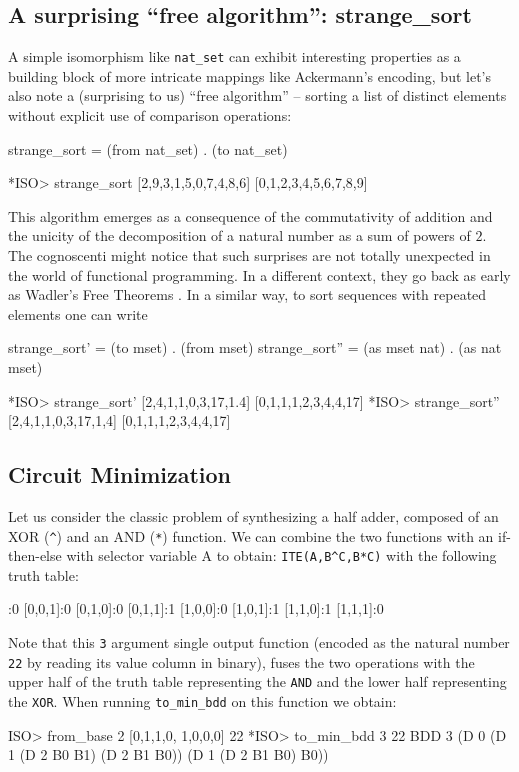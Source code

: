 \documentclass[]{INCLUDES/llncs}
\begin{document}
\subsection{A surprising ``free algorithm'': strange\_sort}
A simple isomorphism like
{\tt nat\_set} can exhibit
interesting properties as a building block of more intricate mappings
like Ackermann's encoding, but let's also note a (surprising to us)
``free algorithm'' -- sorting a list of distinct elements without
explicit use of comparison operations:
\begin{code}
strange_sort = (from nat_set) . (to nat_set)
\end{code}
\begin{codex}
*ISO> strange_sort [2,9,3,1,5,0,7,4,8,6]
[0,1,2,3,4,5,6,7,8,9]
\end{codex}
This algorithm emerges as a consequence of the commutativity of
addition and the unicity of the decomposition of
a natural number as a sum of powers of $2$.
The cognoscenti might notice that
such surprises are not totally unexpected
in the world of functional programming.
In a different context, they
go back as early as 
Wadler's Free Theorems \cite{wadler:theor}.
In a similar way, to sort sequences with repeated elements one can write
\begin{code}
strange_sort' = (to mset) . (from mset)
strange_sort'' = (as mset nat) . (as nat mset)
\end{code}
\begin{codex}
*ISO> strange_sort' [2,4,1,1,0,3,17,1.4]
[0,1,1,1,2,3,4,4,17]
*ISO> strange_sort'' [2,4,1,1,0,3,17,1,4]
[0,1,1,1,2,3,4,4,17]
\end{codex}

\subsection{Circuit Minimization}
Let us consider the classic problem of synthesizing a half adder, composed
of an XOR (\verb~^~) and an AND  (\verb~*~) function. We can combine
the two functions with an if-then-else with selector variable A to
obtain: \verb~ITE(A,B^C,B*C)~ with the following truth table:
\begin{codex}
[0,0,0]:0
[0,0,1]:0
[0,1,0]:0
[0,1,1]:1
[1,0,0]:0
[1,0,1]:1
[1,1,0]:1
[1,1,1]:0
\end{codex}
Note that this {\tt 3} argument single output function (encoded as
the natural number {\tt 22} by reading its value column in binary), fuses the
two operations with the upper half of the truth table representing 
the {\tt AND} and the lower half representing the {\tt XOR}.
When running {\tt to\_min\_bdd} on this function we obtain:
\begin{codex}
ISO> from_base 2 [0,1,1,0, 1,0,0,0]
22
*ISO> to_min_bdd 3 22
BDD 3 (D 0 
  (D 1 (D 2 B0 B1) (D 2 B1 B0)) 
              (D 1 (D 2 B1 B0) B0))
\end{codex}
\end{document}
